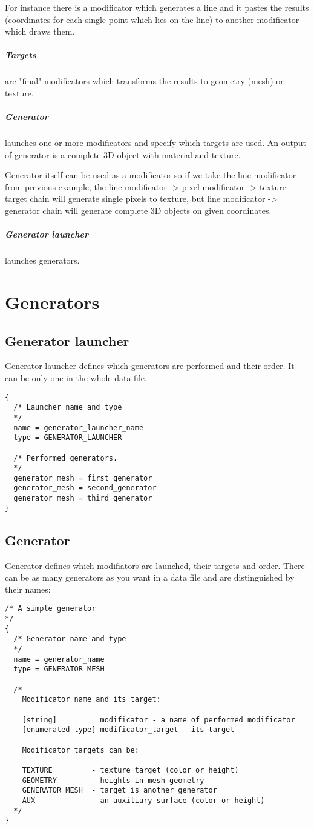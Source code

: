 \documentclass[11pt]{article}
\begin{document}
For instance there is a modificator which generates a line and it 
pastes the results (coordinates for each single point which lies on the line) 
to another modificator which draws them.

\subparagraph{Targets}
are "final" modificators which transforms the results to geometry (mesh) or texture. 

\subparagraph{Generator}
launches one or more modificators and specify which targets are used.  
An output of generator is a complete 3D object with material and texture. 

Generator itself can be used as a modificator so
if we take the line modificator from previous example, 
the line modificator -> pixel modificator -> texture target chain will 
generate single pixels to texture, but line modificator -> generator 
chain will generate complete 3D objects on given coordinates.

\subparagraph{Generator launcher}
launches generators.

\section{Generators}

\subsection{Generator launcher}

Generator launcher defines which generators are performed and their order. 
It can be only one in the whole data file.

\begin{verbatim}
{
  /* Launcher name and type
  */
  name = generator_launcher_name
  type = GENERATOR_LAUNCHER

  /* Performed generators. 
  */
  generator_mesh = first_generator
  generator_mesh = second_generator
  generator_mesh = third_generator
}
\end{verbatim}

\subsection{Generator}

Generator defines which modifiators are launched, their targets and order. 
There can be as many generators as you want in a data file and 
are distinguished by their names:

\begin{verbatim}
/* A simple generator
*/
{
  /* Generator name and type
  */
  name = generator_name
  type = GENERATOR_MESH

  /*
    Modificator name and its target:
    
    [string]          modificator - a name of performed modificator
    [enumerated type] modificator_target - its target
    
    Modificator targets can be:
    
    TEXTURE         - texture target (color or height)
    GEOMETRY        - heights in mesh geometry
    GENERATOR_MESH  - target is another generator
    AUX             - an auxiliary surface (color or height)
  */
}
\end{verbatim}
\end{document}
